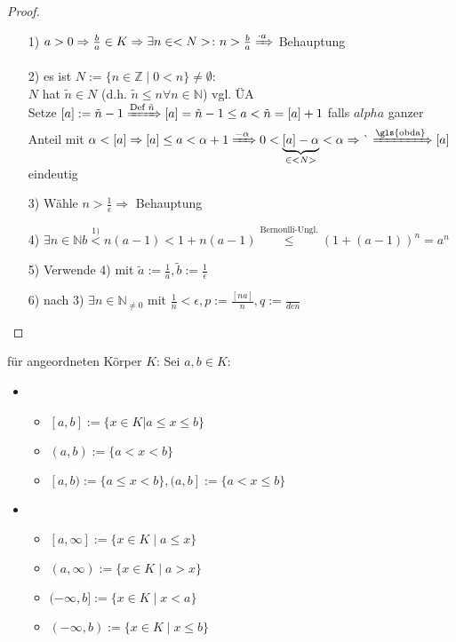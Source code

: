 \begin{proof}
	\begin{itemize}
		\item[1)] $a > 0 \Rightarrow \frac{b}{a} \in K \Rightarrow \exists n \in \mathbb{N} \colon n > \frac{b}{a} \xRightarrow{\cdot a}$ Behauptung
		\item[2)] es ist $N:=\{n \in \mathbb{Z} \mid 0 < n\}\neq \emptyset$:\\
		$N$ hat  $\tilde{n} \in N$ (d.h. $\tilde{n} \leq n \forall n \in \mathbb{N}$) vgl. ÜA\\
		Setze $[a]:=\tilde{n} -1 \xRightarrow{\text{Def }\tilde{n}} [a] = \tilde{n} -1 \leq a < \tilde{n} = [a] +1$ falls $alpha$ ganzer Anteil mit $\alpha < [a] \Rightarrow [a] \leq a < \alpha +1 \xRightarrow{-\alpha} 0 < \underbrace{[a] - \alpha}_{\in \mathbb{N}} < \alpha \Rightarrow \lightning \xRightarrow{\text{\gls{obda}}} [a]$ eindeutig
		\item[3)] Wähle $n > \frac{1}{\epsilon} \Rightarrow$ Behauptung
		\item[4)] $\exists n \in \mathbb{N} b \overset{\text{1)}}{<} n(a-1) < 1 + n(a-1) \overset{\text{Bernoulli-Ungl.}}{\leq} (1+(a-1))^n = a^n$
		\item[5)] Verwende 4) mit $\tilde{a}:=\frac{1}{a},\tilde{b}:=\frac{1}{\epsilon}$
		\item[6)] nach 3) $\exists n \in \mathbb{N}_{\neq 0}$ mit $\frac{1}{n} < \epsilon, p:= \frac{[na]}{n},q:= \frac{}{den}$ %
	\end{itemize}  
\end{proof}

\begin{*definition}[Intervall]
	 für angeordneten Körper $K$: Sei $a,b\in K$:
	\begin{itemize}
		\item {}
		\begin{itemize}
			\item $[a,b]:=\{ x\in K | a \le x \le b \}$ 
			\item $(a,b):=\{a < x < b\}$ 
			\item $[a,b) := \{a \le x < b\}, (a,b]:=\{a < x \le b\}$ 
		\end{itemize}
		\item {}
		\begin{itemize}
			\item $[a,\infty]:=\{x\in K\mid a \le x\}$
			\item $(a,\infty):=\{x\in K\mid a > x\}$
            \item $(-\infty, b]:= \{x \in K \mid x< a\}$
            \item $(-\infty, b) := \{x\in K\mid x \leq b\}$
		\end{itemize}
	\end{itemize}
\end{*definition}

